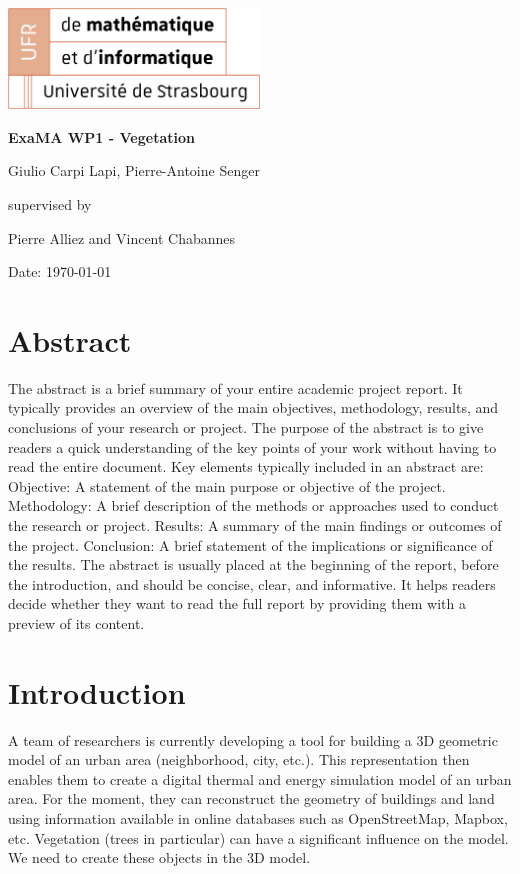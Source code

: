 \documentclass[12pt]{article}
\begin{document}
\begin{titlepage}
    \centering
    \includegraphics[width=0.5\textwidth]{images/logo_ufr.png}\par\vspace{1cm}
    \vspace{1.5cm}
    {\huge\bfseries ExaMA WP1 - Vegetation\par}
    \vspace{2cm}
    {\Large Giulio Carpi Lapi, Pierre-Antoine Senger\par}
    \vfill
    supervised by\par
    Pierre Alliez and Vincent Chabannes

    \vfill

    {\large Date: \today\par}
\end{titlepage}

\tableofcontents
\newpage

\section{Abstract}
The abstract is a brief summary of your entire academic project report.
It typically provides an overview of the main objectives, methodology,
results, and conclusions of your research or project.
The purpose of the abstract is to give readers a quick understanding
of the key points of your work without having to read the entire document.
Key elements typically included in an abstract are:
Objective: A statement of the main purpose or objective of the project.
Methodology: A brief description of the methods or approaches
used to conduct the research or project.
Results: A summary of the main findings or outcomes of the project.
Conclusion: A brief statement of the implications or significance of the results.
The abstract is usually placed at the beginning of the report,
before the introduction, and should be concise, clear, and informative.
It helps readers decide whether they want to read the full report
by providing them with a preview of its content.

\section{Introduction}
A team of researchers is currently developing a tool for building
a 3D geometric model of an urban area (neighborhood, city, etc.).
This representation then enables them to create
a digital thermal and energy simulation model of an urban area.
For the moment, they can reconstruct the geometry of buildings and land
using information available in online databases such as OpenStreetMap, Mapbox, etc.
Vegetation (trees in particular) can have a significant influence on the model.
We need to create these objects in the 3D model.
\end{document}
